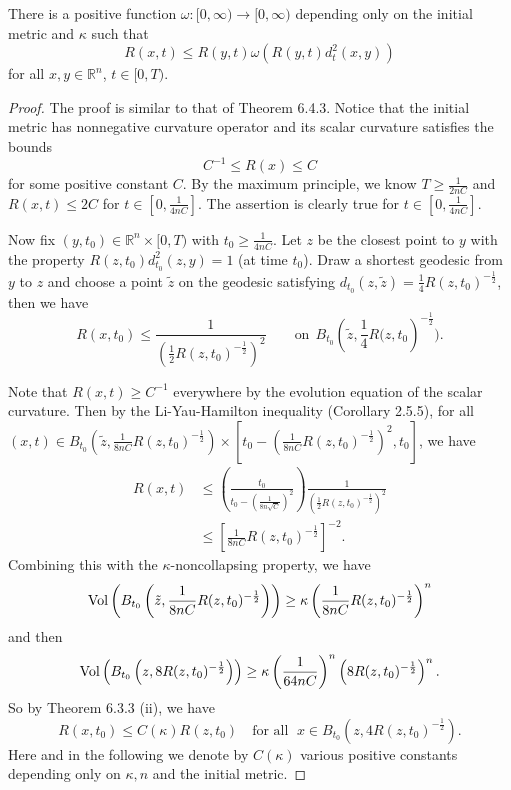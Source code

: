\begin{lemma}
  \label{lem:cz-standard-solution-spatial-curvature-comparison}
There is a positive function
$\omega:[0,\infty)\rightarrow[0,\infty)$ depending only on the
initial metric and $\kappa$ such that
$$
  R(x,t)\leq R(y,t)\omega(R(y,t)d_{t}^{2}(x,y))
$$
for all $x,y\in \mathbb{R}^{n}$, $t\in[0,T)$.
\end{lemma}
\begin{proof}
The proof is similar to that of Theorem 6.4.3. Notice that the
initial metric has nonnegative curvature operator and its scalar
curvature satisfies the bounds \begin{equation}
C^{-1}\leqslant R(x)\leqslant C %
\end{equation} for some positive constant $C$. By the maximum principle, we
know $T\geq\frac{1}{2nC}$ and $R(x,t)\leq 2C$ for
$t\in[0,\frac{1}{4nC}]$. The assertion is clearly true for
$t\in[0,\frac{1}{4nC}]$.

Now fix $(y,t_{0})\in \mathbb{R}^{n}\times[0,T)$ with
$t_{0}\geq\frac{1}{4nC}$. Let $z$ be the closest point to $y$ with
the property $R(z,t_{0})d^{2}_{t_{0}}(z,y)=1$ (at time $t_{0}$).
Draw a shortest geodesic from $y$ to $z$ and choose a point
$\tilde{z}$ on the geodesic satisfying $d_{t_{0}}(z,\tilde{z})
=\frac{1}{4}R(z,t_{0})^{-\frac{1}{2}}$, then we have
$$
 R(x,t_{0})\leq\frac{1}{(\frac{1}{2}R(z,t_{0})^{-\frac{1}{2}})^{2}}
    \qquad \mbox{on}\ \
 B_{t_{0}}\left(\tilde{z},\frac{1}{4}R(z,t_{0}\right)^{-\frac{1}{2}}).
$$

Note that $R(x,t)\geqslant C^{-1}$ everywhere by the evolution
equation of the scalar curvature. Then by the Li-Yau-Hamilton
inequality (Corollary 2.5.5), for all $(x,t)\in
B_{t_{0}}(\tilde{z},\frac{1}{8nC}R(z,t_{0})^{-\frac{1}{2}})
\times[t_{0}-(\frac{1}{8nC}R(z,t_{0})^{-\frac{1}{2}})^{2},t_{0}]
$, we have
\begin{equation*}
\begin{split}
R(x,t)&  \leq \left(\frac{t_{0}}{t_{0}-\left(\frac{1}{8n\sqrt{C}}\right)^{2}}\right)
\frac{1}{\left(\frac{1}{2}R(z,t_{0})^{-\frac{1}{2}}\right)^{2}}\\
&  \leq \left[\frac{1}{8nC}R(z,t_{0})^{-\frac{1}{2}}\right]^{-2}.
\end{split}
\end{equation*}
Combining this with the $\kappa$-noncollapsing property, we have
$$
\operatorname{Vol}
\left(B_{t_{0}}\left(\tilde{z},\frac{1}{8nC}R(z,t_{0})^{-\frac{1}{2}}\right)\right)
\geq \kappa \left(\frac{1}{8nC}R(z,t_{0})^{-\frac{1}{2}}\right)^{n}
$$
and then
$$
\operatorname{Vol} \left(B_{t_{0}}\left(z,8R(z,t_{0})^{-\frac{1}{2}}\right)\right) \geq \kappa
\left(\frac{1}{64nC}\right)^{n}\left(8R(z,t_{0})^{-\frac{1}{2}}\right)^{n}.
$$
So by Theorem 6.3.3 (ii), we have
$$
R(x,t_{0})\leq C(\kappa)R(z,t_{0})\quad \text{for all }\; x\in
B_{t_{0}}\left(z,4R(z,t_{0})^{-\frac{1}{2}}\right).
$$
Here and in the following we denote by $C(\kappa)$ various
positive constants depending only on $\kappa,n$ and the initial
metric.


\end{proof}

